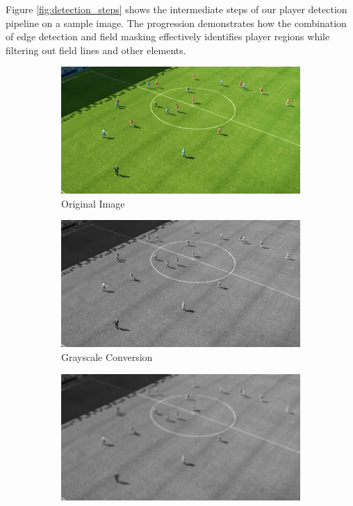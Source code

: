 \documentclass[10pt,twocolumn,letterpaper]{article}
\begin{document}
Figure \ref{fig:detection_steps} shows the intermediate steps of our player detection pipeline on a sample image. The progression demonstrates how the combination of edge detection and field masking effectively identifies player regions while filtering out field lines and other elements.

\begin{figure}[t]
  \centering
  \begin{subfigure}[b]{0.48\linewidth}
    \centering
    \includegraphics[width=\linewidth]{../data/image_2.png}
    \caption{Original Image}
  \end{subfigure}
  \begin{subfigure}[b]{0.48\linewidth}
    \centering
    \includegraphics[width=\linewidth]{../edge_detection_steps/01_grayscale.jpg}
    \caption{Grayscale Conversion}
  \end{subfigure}
  \begin{subfigure}[b]{0.48\linewidth}
    \centering
    \includegraphics[width=\linewidth]{../edge_detection_steps/02_gaussian_blur.jpg}

\end{subfigure}
\end{figure}
\end{document}
